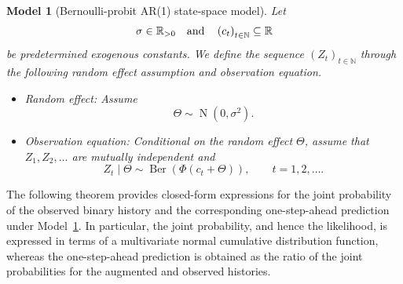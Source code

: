 \documentclass[11pt,authoryear]{elsarticle}
\def\Real{\mathbb{R}}
\newtheorem{model}{Model}
\theoremstyle{nopunct}
\numberwithin{equation}{section}
\begin{document}
\begin{model}[Bernoulli-probit AR(1) state-space model]
\label{model.1}
Let
\[
\sigma\in\Real_{>0}\quad\hbox{and}\quad \left(c_t\right)_{t\in\mathbb N}\subseteq\Real
\]
be predetermined exogenous constants. We define the  sequence
\((Z_t)_{t\in\mathbb N}\) through the following random effect assumption and observation
equation.

\begin{itemize}
  \item[i.] Random effect: Assume
  \[
  \Theta\sim \operatorname{N}(0, \sigma^2).
  \]

  \item[ii.] Observation equation:
  Conditional on the random effect $\Theta$, assume that
   \(Z_1,Z_2,\ldots\) are mutually independent and
  \[
  Z_t\mid \Theta
  \sim
  \operatorname{Ber}\left(\Phi(c_t+\Theta)\right),
  \qquad t=1,2,\ldots.
  \]
\end{itemize}
\end{model}


The following theorem provides closed-form expressions for the joint
probability of the observed binary history and the corresponding
one-step-ahead prediction under Model~\ref{model.1}. In particular, the
joint probability, and hence the likelihood, is expressed in terms of a
multivariate normal cumulative distribution function, whereas the
one-step-ahead prediction is obtained as the ratio of the joint
probabilities for the augmented and observed histories.
\end{document}
